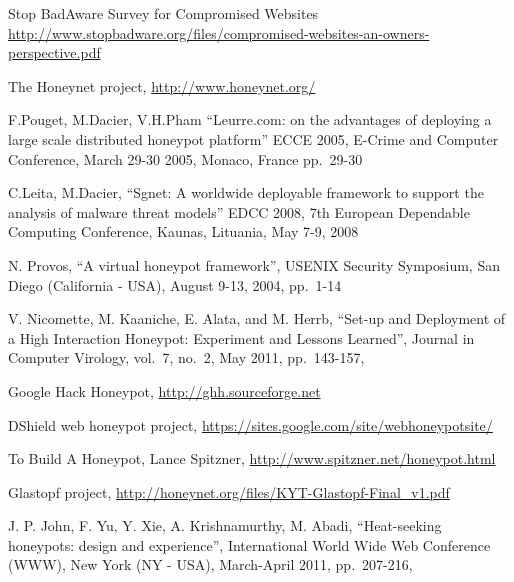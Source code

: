 

\begin{thebibliography}{99} %

Stop BadAware Survey for Compromised Websites
\url{http://www.stopbadware.org/files/compromised-websites-an-owners-perspective.pdf}

The Honeynet project, %
\url{http://www.honeynet.org/} %

F.Pouget, M.Dacier, V.H.Pham
``Leurre.com: on the advantages of deploying a large scale distributed honeypot platform''
ECCE 2005, E-Crime and Computer Conference, March 29-30 2005,
Monaco, France
pp.\ 29-30

C.Leita, M.Dacier,
``Sgnet: A worldwide deployable framework to support the analysis of malware threat models''
EDCC 2008, 7th European Dependable Computing Conference,
Kaunas, Lituania, May 7-9, 2008

N. Provos,
``A virtual honeypot framework'',
USENIX Security Symposium,
San Diego (California - USA), August 9-13, 2004,
pp.\ 1-14

V. Nicomette, M. Kaaniche, E. Alata, and M. Herrb,
``Set-up and Deployment of a High Interaction Honeypot: Experiment and Lessons Learned'',
Journal in Computer Virology,
vol.\ 7, no.\ 2,
May 2011,
pp.\ 143-157,

Google Hack Honeypot,
\url{http://ghh.sourceforge.net}

DShield web honeypot project,
\url{https://sites.google.com/site/webhoneypotsite/}

To Build A Honeypot, Lance Spitzner,
\url{http://www.spitzner.net/honeypot.html}

Glastopf project,
\url{http://honeynet.org/files/KYT-Glastopf-Final_v1.pdf}

J. P. John, F. Yu, Y. Xie, A. Krishnamurthy, M. Abadi,
``Heat-seeking honeypots: design and experience'',
International World Wide Web Conference (WWW),
New York (NY - USA), March-April 2011,
pp.\ 207-216,


\end{thebibliography}
